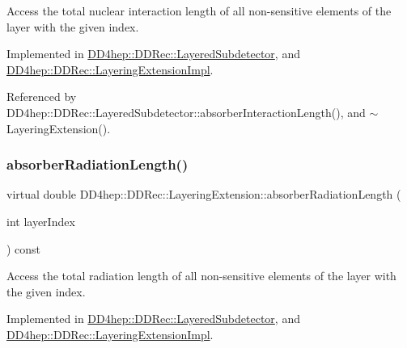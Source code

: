 Access the total nuclear interaction length of all non-\/sensitive elements of the layer with the given index. 



Implemented in \hyperlink{class_d_d4hep_1_1_d_d_rec_1_1_layered_subdetector_a8baadf0d30a20c20b4d41d5e2ad1b60c}{D\+D4hep\+::\+D\+D\+Rec\+::\+Layered\+Subdetector}, and \hyperlink{class_d_d4hep_1_1_d_d_rec_1_1_layering_extension_impl_aeae62d21c9f9d6a4b3a19db6d3cd28a3}{D\+D4hep\+::\+D\+D\+Rec\+::\+Layering\+Extension\+Impl}.



Referenced by D\+D4hep\+::\+D\+D\+Rec\+::\+Layered\+Subdetector\+::absorber\+Interaction\+Length(), and $\sim$\+Layering\+Extension().

\hypertarget{class_d_d4hep_1_1_d_d_rec_1_1_layering_extension_aca33441136624022aa7414895ba81fef}{}\label{class_d_d4hep_1_1_d_d_rec_1_1_layering_extension_aca33441136624022aa7414895ba81fef} 
\subsubsection{\texorpdfstring{absorber\+Radiation\+Length()}{absorberRadiationLength()}}
{\footnotesize\ttfamily virtual double D\+D4hep\+::\+D\+D\+Rec\+::\+Layering\+Extension\+::absorber\+Radiation\+Length (\begin{DoxyParamCaption}\item[{int}]{layer\+Index }\end{DoxyParamCaption}) const\hspace{0.3cm}{\ttfamily [pure virtual]}}



Access the total radiation length of all non-\/sensitive elements of the layer with the given index. 



Implemented in \hyperlink{class_d_d4hep_1_1_d_d_rec_1_1_layered_subdetector_a598c80799720b7eccd4d9ff747742024}{D\+D4hep\+::\+D\+D\+Rec\+::\+Layered\+Subdetector}, and \hyperlink{class_d_d4hep_1_1_d_d_rec_1_1_layering_extension_impl_a81b2720593495043fbe86012b0936a37}{D\+D4hep\+::\+D\+D\+Rec\+::\+Layering\+Extension\+Impl}.



